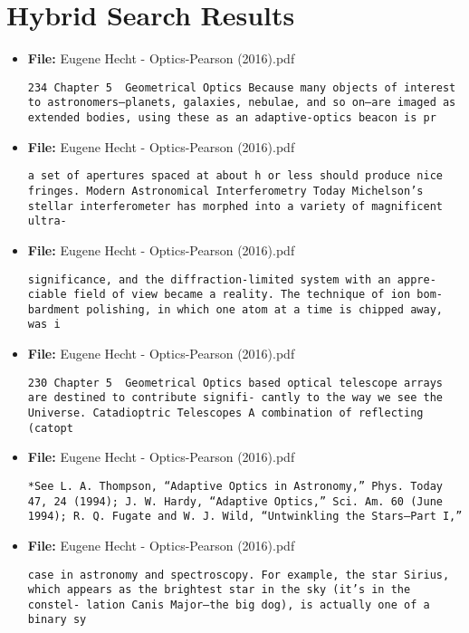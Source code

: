 \section*{Hybrid Search Results}
\begin{itemize}
  \item \textbf{File:} Eugene Hecht - Optics-Pearson (2016).pdf

  \texttt{234	 Chapter 5  Geometrical Optics Because many objects of interest to astronomers—planets,  galaxies, nebulae, and so on—are imaged as extended bodies,  using these as an adaptive-optics beacon is pr}

  \item \textbf{File:} Eugene Hecht - Optics-Pearson (2016).pdf

  \texttt{a set of apertures spaced at about h or less should produce nice  fringes. Modern Astronomical Interferometry Today Michelson’s stellar interferometer has morphed into a  variety of magnificent ultra-}

  \item \textbf{File:} Eugene Hecht - Optics-Pearson (2016).pdf

  \texttt{significance, and the diffraction-limited system with an appre- ciable field of view became a reality. The technique of ion bom- bardment polishing, in which one atom at a time is chipped  away, was i}

  \item \textbf{File:} Eugene Hecht - Optics-Pearson (2016).pdf

  \texttt{230	 Chapter 5  Geometrical Optics based optical telescope arrays are destined to contribute signifi- cantly to the way we see the Universe. Catadioptric Telescopes A combination of reflecting (catopt}

  \item \textbf{File:} Eugene Hecht - Optics-Pearson (2016).pdf

  \texttt{*See L. A. Thompson, “Adaptive Optics in Astronomy,” Phys. Today 47, 24 (1994);  J. W. Hardy, “Adaptive Optics,” Sci. Am. 60 (June 1994); R. Q. Fugate and W. J.  Wild, “Untwinkling the Stars—Part I,” }

  \item \textbf{File:} Eugene Hecht - Optics-Pearson (2016).pdf

  \texttt{case in astronomy and spectroscopy. For example, the star Sirius,  which appears as the brightest star in the sky (it’s in the constel- lation Canis Major—the big dog), is actually one of a binary  sy}


\end{itemize}
